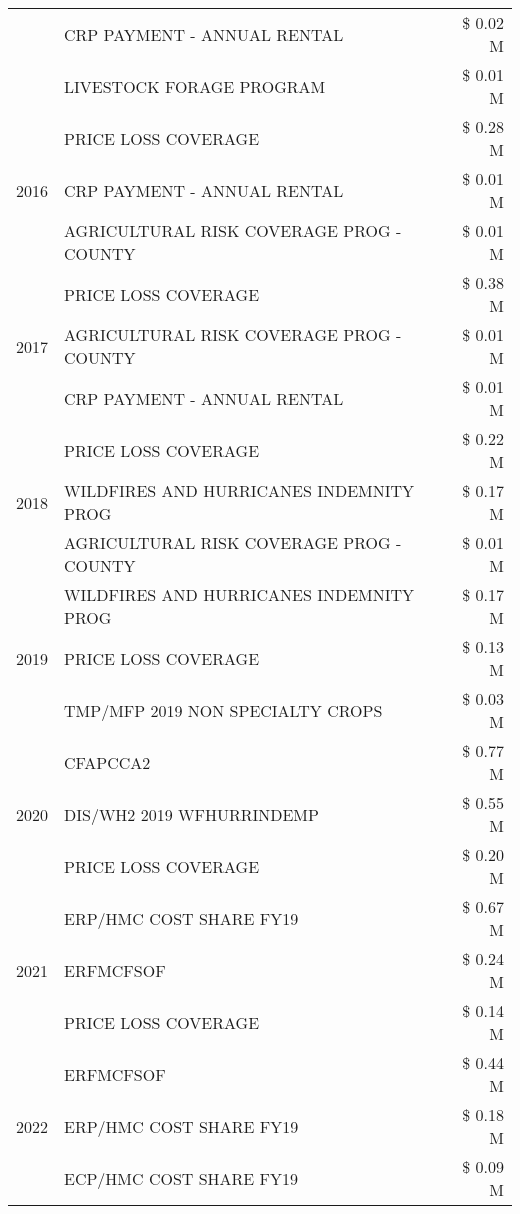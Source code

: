 \begin{tabular}{llr}
 & CRP PAYMENT - ANNUAL RENTAL & \$ 0.02 M \\
 & LIVESTOCK FORAGE PROGRAM & \$ 0.01 M \\
\cline{1-3}
\multirow[t]{3}{*}{2016} & PRICE LOSS COVERAGE & \$ 0.28 M \\
 & CRP PAYMENT - ANNUAL RENTAL & \$ 0.01 M \\
 & AGRICULTURAL RISK COVERAGE PROG - COUNTY & \$ 0.01 M \\
\cline{1-3}
\multirow[t]{3}{*}{2017} & PRICE LOSS COVERAGE & \$ 0.38 M \\
 & AGRICULTURAL RISK COVERAGE PROG - COUNTY & \$ 0.01 M \\
 & CRP PAYMENT - ANNUAL RENTAL & \$ 0.01 M \\
\cline{1-3}
\multirow[t]{3}{*}{2018} & PRICE LOSS COVERAGE & \$ 0.22 M \\
 & WILDFIRES AND HURRICANES INDEMNITY PROG & \$ 0.17 M \\
 & AGRICULTURAL RISK COVERAGE PROG - COUNTY & \$ 0.01 M \\
\cline{1-3}
\multirow[t]{3}{*}{2019} & WILDFIRES AND HURRICANES INDEMNITY PROG & \$ 0.17 M \\
 & PRICE LOSS COVERAGE & \$ 0.13 M \\
 & TMP/MFP 2019 NON SPECIALTY CROPS & \$ 0.03 M \\
\cline{1-3}
\multirow[t]{3}{*}{2020} & CFAPCCA2 & \$ 0.77 M \\
 & DIS/WH2 2019 WFHURRINDEMP & \$ 0.55 M \\
 & PRICE LOSS COVERAGE & \$ 0.20 M \\
\cline{1-3}
\multirow[t]{3}{*}{2021} & ERP/HMC COST SHARE FY19 & \$ 0.67 M \\
 & ERFMCFSOF & \$ 0.24 M \\
 & PRICE LOSS COVERAGE & \$ 0.14 M \\
\cline{1-3}
\multirow[t]{3}{*}{2022} & ERFMCFSOF & \$ 0.44 M \\
 & ERP/HMC COST SHARE FY19 & \$ 0.18 M \\
 & ECP/HMC COST SHARE FY19 & \$ 0.09 M \\
\cline{1-3}
\bottomrule
\end{tabular}
